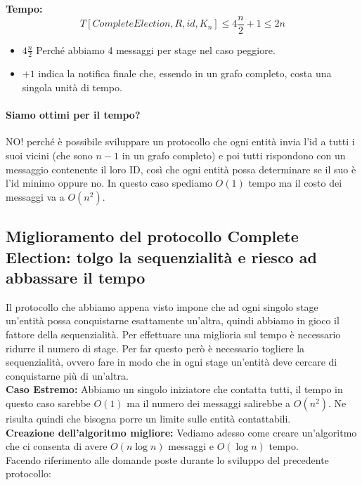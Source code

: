 \textbf{Tempo:}\\ $$T[CompleteElection, R, id, K_n] \leq 4 \frac{n}{2} + 1 \leq
    2 n$$
\begin{itemize}
    \item $ 4 \frac{n}{2} $ Perché abbiamo 4 messaggi per stage nel caso peggiore.
    \item $+1$ indica la notifica finale che, essendo in un grafo completo, costa
          una singola unità di tempo.
\end{itemize}

\paragraph{Siamo ottimi per il tempo?} NO! perché è possibile sviluppare un
protocollo che ogni entità invia l'id a tutti i suoi vicini (che sono $n-1$ in un
grafo completo) e poi tutti rispondono con un messaggio contenente il loro ID,
così che ogni entità possa determinare se il suo è l'id minimo oppure no. In
questo caso spediamo $O(1)$ tempo ma il costo dei messaggi va a $O(n^2)$.

\subsection{Miglioramento del protocollo Complete Election: tolgo la sequenzialità e riesco ad abbassare il tempo}
Il protocollo che abbiamo appena visto impone che ad ogni singolo stage
un'entità possa conquistarne esattamente un'altra, quindi abbiamo in gioco il
fattore della sequenzialità. Per effettuare una miglioria sul tempo è necessario
ridurre il numero di stage. Per far questo però è necessario togliere la
sequenzialità, ovvero fare in modo che in ogni stage un'entità deve cercare di
conquistarne più di un'altra.\\

\textbf{Caso Estremo:} Abbiamo un singolo iniziatore che contatta tutti, il
tempo in questo caso sarebbe $O(1)$ ma il numero dei messaggi salirebbe a
$O(n^2)$. Ne risulta quindi che bisogna porre un limite sulle entità
contattabili.\\

\textbf{Creazione dell'algoritmo migliore:} Vediamo adesso come creare
un'algoritmo che ci consenta di avere $O(n \log n)$ messaggi e $O(\log n)$
tempo.\\
Facendo riferimento alle domande poste durante lo sviluppo del precedente
protocollo:\\

